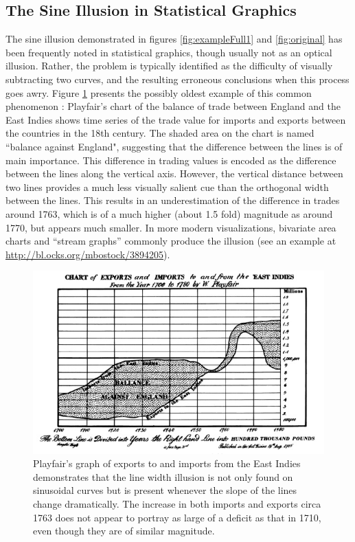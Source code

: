 \documentclass[11pt]{isuthesis}\usepackage[]{graphicx}\usepackage[]{color}
\begin{document}
\subsection{The Sine Illusion in Statistical Graphics}\label{statisticalgraphics}\hfill\newline
The sine illusion demonstrated in figures \ref{fig:exampleFull1} and \ref{fig:original} has been frequently noted in statistical graphics, though usually not as an optical illusion. Rather, the problem is typically identified as the difficulty of visually subtracting two curves, and the resulting erroneous conclusions when this process goes awry. Figure \ref{fig:playfair-debt} presents the possibly oldest example of this common phenomenon \citep{playfair, playfair2}: Playfair's chart of the balance of trade between England and the East Indies shows time series of the trade value for imports  and exports between the countries in the 18th century. The shaded area on the chart is named ``balance against England", suggesting that the difference between the lines is of main importance. This difference in trading values is encoded as the difference between the lines along the vertical axis. However, the vertical distance  between  two lines provides a  much less visually salient cue than the orthogonal width between the lines. This results in  an underestimation \citep{cleveland:1984} of the difference in trades around 1763, which is of a much higher (about 1.5 fold) magnitude as around 1770, but appears much smaller. In more modern visualizations, bivariate area charts and ``stream graphs'' \citep{stackedgraphs} commonly produce the illusion (see an example at \url{http://bl.ocks.org/mbostock/3894205}). 

\begin{figure}[h!tbp]
\centering
\includegraphics[keepaspectratio=TRUE,width=.7\textwidth]{PlayfairExportImports}
\caption[Imports to and Exports from the East Indies in the 1700s]{Playfair's graph of exports to and imports from the East Indies demonstrates that the line width illusion is not only found on sinusoidal curves but is present whenever the slope of the lines change dramatically. The increase in both imports and exports circa 1763 does not appear to portray as large of a deficit as that in 1710, even though they are of similar magnitude.}
\label{fig:playfair-debt}
\end{figure}
\end{document}
